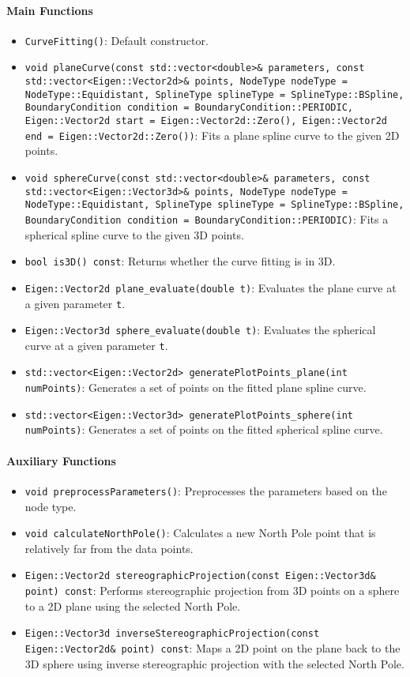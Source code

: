 \documentclass[a4paper]{article}
\begin{document}
\begin{sloppypar}
\paragraph*{Main Functions}
\begin{itemize}
  \item \verb|CurveFitting()|: Default constructor.
  \item \lstinline|void planeCurve(const std::vector<double>& parameters, const std::vector<Eigen::Vector2d>& points, NodeType nodeType = NodeType::Equidistant, SplineType splineType = SplineType::BSpline, BoundaryCondition condition = BoundaryCondition::PERIODIC, Eigen::Vector2d start = Eigen::Vector2d::Zero(), Eigen::Vector2d end = Eigen::Vector2d::Zero())|: Fits a plane spline curve to the given 2D points.
  \item \lstinline|void sphereCurve(const std::vector<double>& parameters, const std::vector<Eigen::Vector3d>& points, NodeType nodeType = NodeType::Equidistant, SplineType splineType = SplineType::BSpline, BoundaryCondition condition = BoundaryCondition::PERIODIC)|: Fits a spherical spline curve to the given 3D points.
  \item \verb|bool is3D() const|: Returns whether the curve fitting is in 3D.
  \item \verb|Eigen::Vector2d plane_evaluate(double t)|: Evaluates the plane curve at a given parameter \verb|t|.
  \item \verb|Eigen::Vector3d sphere_evaluate(double t)|: Evaluates the spherical curve at a given parameter \verb|t|.
  \item \lstinline|std::vector<Eigen::Vector2d> generatePlotPoints_plane(int numPoints)|: Generates a set of points on the fitted plane spline curve.
  \item \verb|std::vector<Eigen::Vector3d> generatePlotPoints_sphere(int numPoints)|: Generates a set of points on the fitted spherical spline curve.
\end{itemize}

\paragraph*{Auxiliary Functions}
\begin{itemize}
  \item \verb|void preprocessParameters()|: Preprocesses the parameters based on the node type.
  \item \verb|void calculateNorthPole()|: Calculates a new North Pole point that is relatively far from the data points.
  \item \lstinline|Eigen::Vector2d stereographicProjection(const Eigen::Vector3d& point) const|: Performs stereographic projection from 3D points on a sphere to a 2D plane using the selected North Pole.
  \item \verb|Eigen::Vector3d inverseStereographicProjection(const Eigen::Vector2d& point) const|: Maps a 2D point on the plane back to the 3D sphere using inverse stereographic projection with the selected North Pole.
\end{itemize}


\end{sloppypar}
\end{document}
